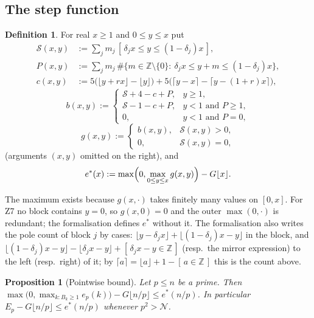 \documentclass[11pt]{amsart}
\newtheorem{proposition}[theorem]{Proposition}
\theoremstyle{definition}
\newtheorem{definition}[theorem]{Definition}
\theoremstyle{remark}
\numberwithin{equation}{section}
\newcommand{\ZZ}{\mathbb{Z}}
\newcommand{\cN}{\mathcal{N}}
\newcommand{\cS}{\mathcal{S}}
\newcommand{\ind}[1]{[\,#1\,]}
\begin{document}
\subsection{The step function}
\begin{definition}\label{def:f}
For real $x\ge1$ and $0\le y\le x$ put
\begin{align*}
  \cS(x,y)&:=\sum_jm_j\,\ind{\delta_jx\le y\le(1-\delta_j)x},\\
  P(x,y)&:=\sum_jm_j\,\#\{m\in\ZZ\setminus\{0\}:\ \delta_jx\le y+m\le(1-\delta_j)x\},\\
  c(x,y)&:=5\bigl(\lfloor y+rx\rfloor-\lfloor y\rfloor\bigr)+5\bigl(\lceil y-x\rceil-\lceil y-(1+r)x\rceil\bigr),
\end{align*}
\[
  b(x,y):=\begin{cases}
  \cS+4-c+P, & y\ge1,\\
  \cS-1-c+P, & y<1\text{ and }P\ge1,\\
  0, & y<1\text{ and }P=0,
  \end{cases}
\]
\[
  g(x,y):=\begin{cases}b(x,y),&\cS(x,y)>0,\\0,&\cS(x,y)=0,\end{cases}
\]
(arguments $(x,y)$ omitted on the right), and
\[
  e^*(x):=\max\Bigl(0,\max_{0\le y\le x}g(x,y)\Bigr)-G\lfloor x\rfloor .
\]
\end{definition}
The maximum exists because $g(x,\cdot)$ takes finitely many values on $[0,x]$. For Z7 no block contains $y=0$,
so $g(x,0)=0$ and the outer $\max(0,\cdot)$ is redundant; the formalisation defines $e^*$ without it. The
formalisation also writes the pole count of block $j$ by cases: $\lfloor y-\delta_jx\rfloor+\lfloor(1-\delta_j)x-y\rfloor$
in the block, and $\lfloor(1-\delta_j)x-y\rfloor-\lfloor\delta_jx-y\rfloor+\ind{\delta_jx-y\in\ZZ}$ (resp.\ the mirror
expression) to the left (resp.\ right) of it; by $\lceil a\rceil=\lfloor a\rfloor+1-\ind{a\in\ZZ}$ this is the
count above.

\begin{proposition}[Pointwise bound]\label{prop:pointwise}
Let $p\le n$ be a prime. Then $\max\bigl(0,\max_{k:B_k\ge1}e_p(k)\bigr)-G\lfloor n/p\rfloor\le e^*(n/p)$. In
particular $E_p-G\lfloor n/p\rfloor\le e^*(n/p)$ whenever $p^2>\cN$.
\end{proposition}
\end{document}
